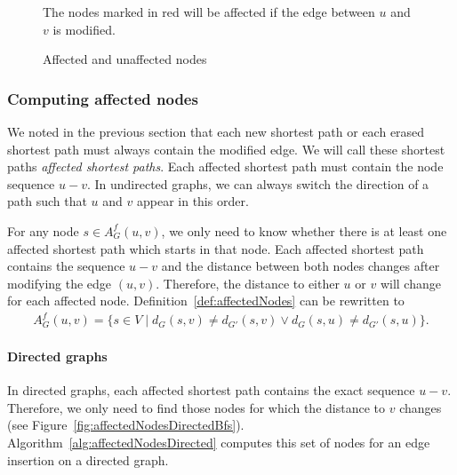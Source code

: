 \begin{figure}[h!]
\centering
{}
\caption{Affected and unaffected nodes}{The nodes marked in red will be affected if the edge between $u$ and $v$ is modified.}
\label{fig:affectedNodes}
\end{figure}


\subsubsection{Computing affected nodes}
We noted in the previous section that each new shortest path or each erased shortest path must always contain the modified edge. We will call these shortest paths \emph{affected shortest paths}. Each affected shortest path must contain the node sequence $u - v$. In undirected graphs, we can always switch the direction of a path such that $u$ and $v$ appear in this order.

For any node $s \in A_G^f(u, v)$, we only need to know whether there is at least one affected shortest path which starts in that node. Each affected shortest path contains the sequence $u - v$ and the distance between both nodes changes after modifying the edge $(u, v)$. Therefore, the distance to either $u$ or $v$ will change for each affected node. Definition~\ref{def:affectedNodes} can be rewritten to
\begin{align}
	A_G^f(u, v) = \{s \in V \mid d_G(s, v) \neq d_{G'}(s, v) \lor d_G(s, u) \neq d_{G'}(s, u)\}.
\end{align}


\paragraph{Directed graphs}
In directed graphs, each affected shortest path contains the exact sequence $u - v$. Therefore, we only need to find those nodes for which the distance to $v$ changes (see Figure~\ref{fig:affectedNodesDirectedBfs}). Algorithm~\ref{alg:affectedNodesDirected} computes this set of nodes for an edge insertion on a directed graph.

